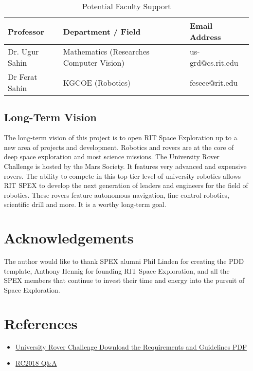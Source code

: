 \documentclass[conference]{IEEEtran} %
\begin{document}
\begin{table}[ht!]
    \caption{Potential Faculty Support}
    \centering
    {\renewcommand{\arraystretch}{1.5}
    \begin{tabularx}{\linewidth}{LLL} 
    \hline
    \textbf{Professor} & \textbf{Department / Field} & \textbf{Email Address} \\
    \hline
    Dr. Ugur Sahin & Mathematics (Researches Computer Vision) & us-grd@cs.rit.edu \\
    Dr Ferat Sahin & KGCOE (Robotics) & feseee@rit.edu \\
    \hline
    \end{tabularx}
    }
\label{tab:fac-sup}
\end{table}

\subsection{Long-Term Vision}
\label{subsec:vision}
The long-term vision of this project is to open RIT Space Exploration up to a new area of projects and development. Robotics and rovers are at the core of deep space exploration
and most science missions. The University Rover Challenge is hosted by the Mars Society. It
features very advanced and expensive rovers. The ability to compete in this top-tier level of university robotics allows RIT SPEX to develop the next generation of leaders and engineers for the field of robotics. These rovers feature autonomous navigation, fine control robotics, scientific drill and more. It is a worthy long-term goal.


\section*{Acknowledgements}
The author would like to thank SPEX alumni Phil Linden for creating the PDD template, Anthony Hennig for founding RIT Space Exploration, and all the SPEX members that continue to invest their time and energy into the pursuit of Space Exploration.
\section{References}
\begin{itemize}
  \item \href{http://urc.marssociety.org/files/University%20Rover%20Challenge%20Rules%202018.pdf}{University Rover Challenge Download the Requirements and Guidelines PDF}
  \item \href{http://urc.marssociety.org/home/q-a}{RC2018 Q\&A}
\end{itemize}
\onecolumn
\appendices{}
\end{document}
